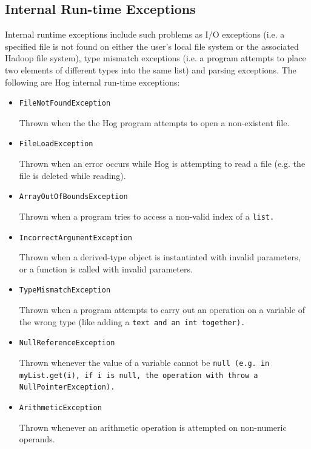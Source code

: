 \documentclass{report}
\begin{document}

\subsection{Internal Run-time Exceptions} %
\label{sub:internal_run_time_exceptions}

Internal run­time exceptions include such problems as I/O exceptions (i.e. a
specified file is not found on either the user’s local file system or the
associated Hadoop file system), type mismatch exceptions (i.e. a program
attempts to place two elements of different types into the same list) and
parsing exceptions. The following are Hog internal run-­time exceptions:


\begin{itemize}
  \item[] \tt FileNotFoundException \rm
  
  Thrown when the the Hog program attempts to open a non-existent file.
  
  \item[] \tt FileLoadException \rm
  
  Thrown when an error occurs while Hog is attempting to read a file (e.g. the
file is deleted while reading).
  
  \item[] \tt ArrayOutOfBoundsException \rm
  
  Thrown when a program tries to access a non-valid index of a \tt list\rm.
  
  \item[] \tt IncorrectArgumentException \rm
  
  Thrown when a derived-type object is instantiated with invalid parameters, or
a function is called with invalid parameters.
  
  \item[] \tt TypeMismatchException \rm
  
  Thrown when a program attempts to carry out an operation on a variable of the
wrong type (like adding a \tt text \rm and an \tt int \rm together).
    
  \item[] \tt NullReferenceException \rm
  
  Thrown whenever the value of a variable cannot be \tt null \rm (e.g. in \tt
myList.get(i)\rm, if \tt i \rm is \tt null\rm, the operation with throw a \tt
NullPointerException\rm).
  
  \item[] \tt ArithmeticException \rm
  
  Thrown whenever an arithmetic operation is attempted on non-numeric operands.
  
\end{itemize}
\end{document}
